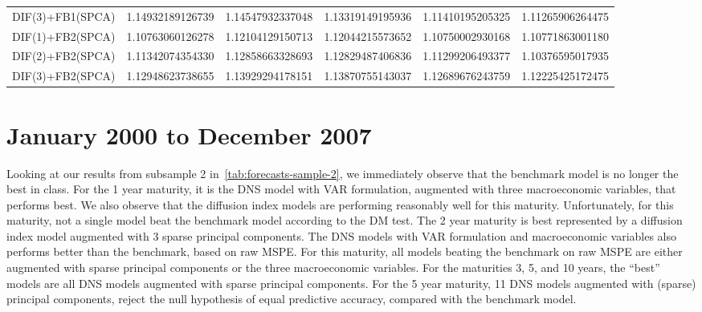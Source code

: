 \begin{table}[H]
\begin{adjustbox}{totalheight=\baselineskip}
\begin{tabular}{lSSSSS}
DIF(3)+FB1(SPCA) & 1.14932189126739 & 1.14547932337048 & 1.13319149195936 & 1.11410195205325 & 1.11265906264475 \\ 
DIF(1)+FB2(SPCA) & 1.10763060126278 & 1.12104129150713 & 1.12044215573652 & 1.10750002930168 & 1.10771863001180 \\ 
DIF(2)+FB2(SPCA) & 1.11342074354330 & 1.12858663328693 & 1.12829487406836 & 1.11299206493377 & 1.10376595017935 \\ 
DIF(3)+FB2(SPCA) & 1.12948623738655 & 1.13929294178151 & 1.13870755143037 & 1.12689676243759 & 1.12225425172475 \\ \bottomrule 
\end{tabular}
\end{adjustbox}
\end{table}

\section{January 2000 to December 2007}
Looking at our results from subsample 2 in~\cref{tab:forecasts-sample-2}, we immediately observe that the benchmark model is no longer the best in class. 
For the 1 year maturity, it is the DNS model with VAR formulation, augmented with three macroeconomic variables, that performs best. 
We also observe that the diffusion index models are performing reasonably well for this maturity. 
Unfortunately, for this maturity, not a single model beat the benchmark model according to the DM test. 
The 2 year maturity is best represented by a diffusion index model augmented with 3 sparse principal components. 
The DNS models with VAR formulation and macroeconomic variables also performs better than the benchmark, based on raw MSPE.
For this maturity, all models beating the benchmark on raw MSPE are either augmented with sparse principal components or the three macroeconomic variables.
For the maturities 3, 5, and 10 years, the \enquote{best} models are all DNS models augmented with sparse principal components. 
For the 5 year maturity, 11 DNS models augmented with (sparse) principal components, reject the null hypothesis of equal predictive accuracy, compared with the benchmark model. 

